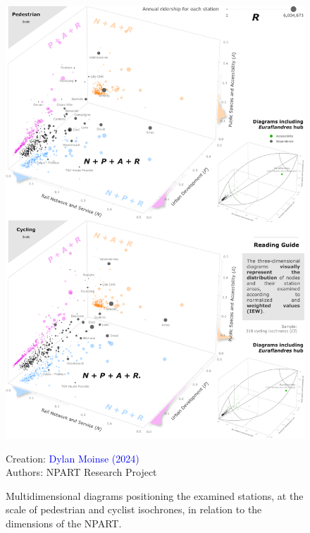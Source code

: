 \begin{refsegment}
\begin{figure}[h!]\vspace*{4pt}
    \caption{Multidimensional diagrams positioning the examined stations, at the scale of pedestrian and cyclist isochrones, in relation to the dimensions of the NPART.}
    \label{fig-chap6:diagramme-cubes}
    \centerline{\includegraphics[width=1\columnwidth]{src/Figures/Chap-6/EN_NPART_Cubes.pdf}}
    \vspace{5pt}
    \begin{flushright}\scriptsize{
    Creation: \textcolor{blue}{Dylan Moinse (2024)}
    \\
    Authors: \acrshort{NPART} Research Project
    }\end{flushright}
\end{figure}


\end{refsegment}
